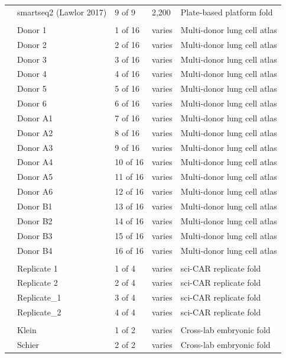 \documentclass[11pt]{article}
\begin{document}
\begin{table}[htbp]
\begin{tabularx}{\textwidth}{@{}L{0.18\textwidth} L{0.18\textwidth} L{0.10\textwidth} L{0.10\textwidth} Y@{}}
& smartseq2 (Lawlor 2017) & 9 of 9 & 2,200 & Plate-based platform fold \\
\addlinespace
{} \\
& Donor 1 & 1 of 16 & varies & Multi-donor lung cell atlas \\
& Donor 2 & 2 of 16 & varies & Multi-donor lung cell atlas \\
& Donor 3 & 3 of 16 & varies & Multi-donor lung cell atlas \\
& Donor 4 & 4 of 16 & varies & Multi-donor lung cell atlas \\
& Donor 5 & 5 of 16 & varies & Multi-donor lung cell atlas \\
& Donor 6 & 6 of 16 & varies & Multi-donor lung cell atlas \\
& Donor A1 & 7 of 16 & varies & Multi-donor lung cell atlas \\
& Donor A2 & 8 of 16 & varies & Multi-donor lung cell atlas \\
& Donor A3 & 9 of 16 & varies & Multi-donor lung cell atlas \\
& Donor A4 & 10 of 16 & varies & Multi-donor lung cell atlas \\
& Donor A5 & 11 of 16 & varies & Multi-donor lung cell atlas \\
& Donor A6 & 12 of 16 & varies & Multi-donor lung cell atlas \\
& Donor B1 & 13 of 16 & varies & Multi-donor lung cell atlas \\
& Donor B2 & 14 of 16 & varies & Multi-donor lung cell atlas \\
& Donor B3 & 15 of 16 & varies & Multi-donor lung cell atlas \\
& Donor B4 & 16 of 16 & varies & Multi-donor lung cell atlas \\
\addlinespace
{} \\
& Replicate 1 & 1 of 4 & varies & sci-CAR replicate fold \\
& Replicate 2 & 2 of 4 & varies & sci-CAR replicate fold \\
& Replicate\_1 & 3 of 4 & varies & sci-CAR replicate fold \\
& Replicate\_2 & 4 of 4 & varies & sci-CAR replicate fold \\
\addlinespace
{} \\
& Klein & 1 of 2 & varies & Cross-lab embryonic fold \\
& Schier & 2 of 2 & varies & Cross-lab embryonic fold \\

\end{tabularx}
\end{table}
\end{document}
